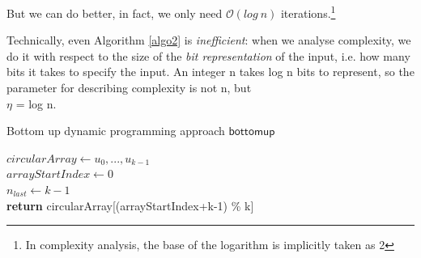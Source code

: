 \documentclass{article}
\begin{document}
But we can do better, in fact, we only need $\mathcal{O}(log~n)$ iterations.\footnote[4]{In complexity analysis, the base of the logarithm is implicitly taken as 2}

Technically, even Algorithm \ref{algo2} is \textit{inefficient}: when we analyse complexity, we do it with respect to the size of the \textit{bit representation} of the input, i.e. how many bits it takes to specify the input. An integer n takes log n bits to represent, so the parameter for describing complexity is not n, but\\ $\eta$ = log n.

\newpage
\begin{algorithm}[ht]
\label{algo2}
\caption {Bottom up dynamic programming approach $\mathsf{bottomup}$}
\SetAlgoLined
\DontPrintSemicolon
{}
$circularArray \gets u_0,...,u_{k-1}$\\
$arrayStartIndex \gets 0$\\
$n_{last} \gets k-1$\\
\textbf{return} circularArray[(arrayStartIndex+k-1) \% k]
\end{algorithm}
\end{document}
